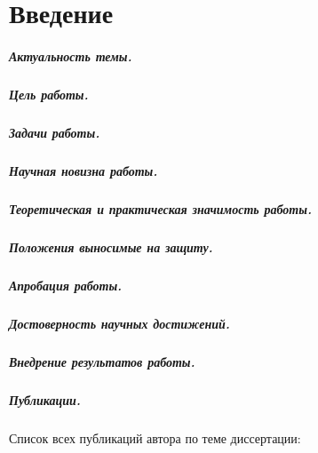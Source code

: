 \chapter*{Введение}                         %

\paragraph*{Актуальность темы.}

\paragraph*{Цель работы.}

\paragraph*{Задачи работы.}

\paragraph*{Научная новизна работы.}

\paragraph*{Теоретическая и практическая значимость работы.}

\paragraph*{Положения выносимые на защиту.}

\paragraph*{Апробация работы.}

\paragraph*{Достоверность научных достижений.}

\paragraph*{Внедрение результатов работы.}

\paragraph*{Публикации.} Список всех публикаций автора по теме диссертации:
\printAllMyPapper

